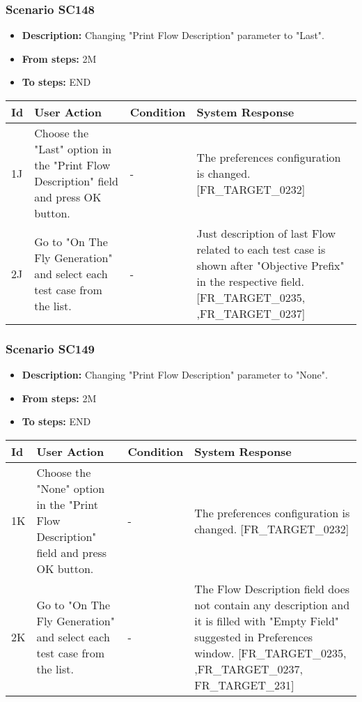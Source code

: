 \documentclass[a4paper,11pt]{article}
\newcommand{\bl}{\\ \hline}
\begin{document}
\subsubsection*{Scenario SC148}
\begin{itemize}
\item {\bf Description:} Changing "Print Flow Description" parameter to "Last".
				
\item {\bf From steps:} 2M
\item {\bf To steps:} END
\end{itemize}
\begin{tabular}{|p{0.4in}|p{1.5in}|p{1.5in}|p{1.5in}|}
\hline
Id & User Action & Condition & System Response \bl 
1J & Choose the "Last" option in the "Print Flow Description"
						field and press OK button. & - & The preferences configuration is changed.
						[FR_TARGET_0232]\bl
2J & Go to "On The Fly Generation" and select each test case
						from the list. & - & Just description of last Flow related to each test case
						is shown after "Objective Prefix" in the respective field.
						[FR_TARGET_0235, ,FR_TARGET_0237]\bl
\end{tabular}
\subsubsection*{Scenario SC149}
\begin{itemize}
\item {\bf Description:} Changing "Print Flow Description" parameter to "None".
				
\item {\bf From steps:} 2M
\item {\bf To steps:} END
\end{itemize}
\begin{tabular}{|p{0.4in}|p{1.5in}|p{1.5in}|p{1.5in}|}
\hline
Id & User Action & Condition & System Response \bl 
1K & Choose the "None" option in the "Print Flow Description"
						field and press OK button. & - & The preferences configuration is changed.
						[FR_TARGET_0232]\bl
2K & Go to "On The Fly Generation" and select each test case
						from the list. & - & The Flow Description field does not contain any
						description and it is filled with "Empty Field" suggested in
						Preferences window. [FR_TARGET_0235, ,FR_TARGET_0237,
						FR_TARGET_231]\bl
\end{tabular}
\end{document}
